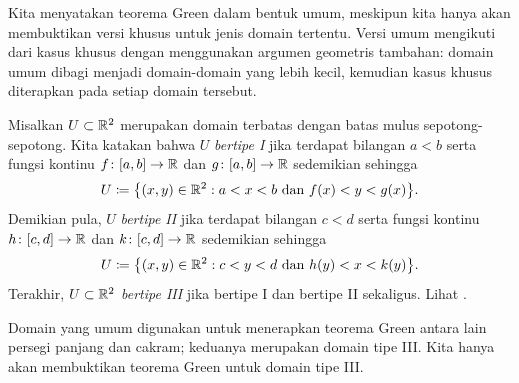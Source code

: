 Kita menyatakan teorema Green dalam bentuk umum, meskipun kita hanya akan
membuktikan versi khusus untuk jenis domain tertentu.  Versi umum mengikuti
dari kasus khusus dengan menggunakan argumen geometris tambahan: domain umum
dibagi menjadi domain-domain yang lebih kecil, kemudian kasus khusus diterapkan
pada setiap domain tersebut.

Misalkan $U \subset {\mathbb{R}}^2$ merupakan domain terbatas dengan batas mulus
sepotong-sepotong.  Kita katakan bahwa $U$ \emph{bertipe I}%
jika terdapat bilangan $a < b$ serta fungsi kontinu
$f \colon [a,b] \to {\mathbb{R}}$ dan $g \colon [a,b] \to {\mathbb{R}}$ sedemikian sehingga
\begin{equation*}
U \coloneqq \bigl\{ (x,y) \in {\mathbb{R}}^2 : a < x < b \text{ dan } f(x) < y < g(x) \bigr\} .
\end{equation*}
Demikian pula, $U$ \emph{bertipe II}
jika terdapat bilangan $c < d$ serta fungsi kontinu
$h \colon [c,d] \to {\mathbb{R}}$ dan $k \colon [c,d] \to {\mathbb{R}}$ sedemikian sehingga
\begin{equation*}
U \coloneqq \bigl\{ (x,y) \in {\mathbb{R}}^2 : c < y < d \text{ dan } h(y) < x < k(y) \bigr\} .
\end{equation*}
Terakhir, $U \subset {\mathbb{R}}^2$ \emph{bertipe III}
jika bertipe I dan bertipe II sekaligus\@.  Lihat .

\begin{myfigureht}
\caption{Tipe-tipe domain untuk teorema Green.\label{fig:greenstypes}}
\end{myfigureht}

Domain yang umum digunakan untuk menerapkan teorema Green antara lain persegi
panjang dan cakram; keduanya merupakan domain tipe III.
Kita hanya akan membuktikan teorema Green untuk domain tipe III.

